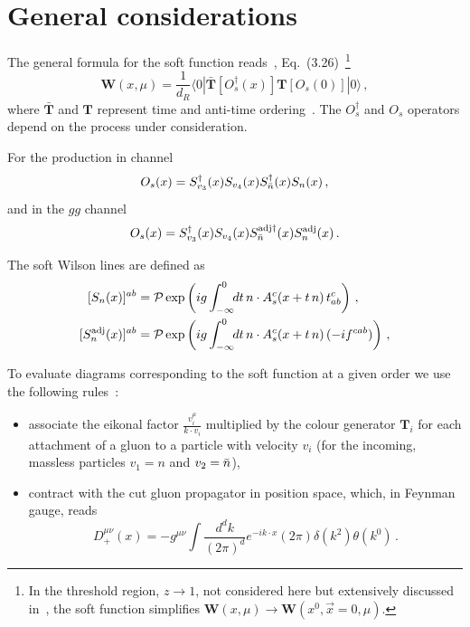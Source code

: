 \documentclass[a4paper,11pt]{report}
\numberwithin{equation}{section}
\begin{document}
\newpage
\chapter{General considerations}

The general formula for the soft function reads~\cite{Ahrens:2010zv}, 
Eq.~(3.26)~\footnote{
In the threshold region, $z\to 1$, not considered here but extensively discussed
in~\cite{Becher:2007ty}, the soft function simplifies 
$\mathbold{W}(x,\mu) \to \mathbold{W}(x^0, \vec x = 0, \mu)$.
}
%
\begin{equation}
  \mathbold{W} (x,\mu) = \frac{1}{d_R} 
  \langle 0| \mathbold{\bar T} [O_s^\dagger (x)] \mathbold{T} [O_s(0)] 
  |0 \rangle\,,
\end{equation}
%
where $\mathbold{\bar T}$ and $\mathbold{T}$ represent time and anti-time
ordering~\cite{Becher:2007ty}.
%
The $O_s^\dagger$ and $O_s$ operators depend on the process under consideration.

For the \ttbar production in \qqbar channel~\cite{Li:2013mia}
%
\begin{equation}
  O_s(x) = S_{v_3}^\dagger(x) S_{v_4}(x) S_{\bar{n}}^\dagger(x) S_{n}(x)\,,
\end{equation}
%
and in the $gg$ channel ~\cite{Li:2013mia}
%
\begin{equation}
  O_s(x) = S_{v_3}^\dagger(x) S_{v_4}(x) 
  S_{\bar{n}}^{\text{adj} \dagger}(x) S_{n}^\text{adj}(x)\,.
\end{equation}

The soft Wilson lines are defined as
%
\begin{subequations}
  \begin{align}
    [S_n(x)]^{ab}  & =  {\cal P} \exp 
    \left( ig \int^0_{-\infty}\!\! dt\, n \cdot A_s^c(x+t\, n)\, t^c_{ab}
    \right)\,, \\
    [S_n^\text{adj}(x)]^{ab}  & =  {\cal P} \exp 
    \left( ig \int^0_{-\infty}\!\! dt\, n \cdot A_s^c(x+t\, n)\, 
    (-i f^{cab})
    \right)\,,
  \end{align}
\end{subequations}

To evaluate diagrams corresponding to the soft function at a given order we use
the following rules~\cite{Ahrens:2010zv}:
%
\begin{itemize}
  \item
  associate the eikonal factor $\displaystyle \frac{v_i^\mu}{k \cdot v_i}$
  multiplied by the colour generator $\mathbold{T}_i$ for each attachment of a
  gluon to a particle with velocity $v_i$ (for the incoming, massless particles
  $v_1 = n$ and $v_2 = \bar{n}$),
  \item
  contract with the cut gluon propagator in position space, which, in Feynman
  gauge, reads
  \begin{equation}
    D^{\mu\nu}_+ (x) = 
    -g^{\mu\nu} \int \frac{d^d k}{(2\pi)^d}
    e^{-i k \cdot x} (2\pi) \delta(k^2) \theta(k^0)\,.
  \end{equation}
\end{itemize}
\end{document}
